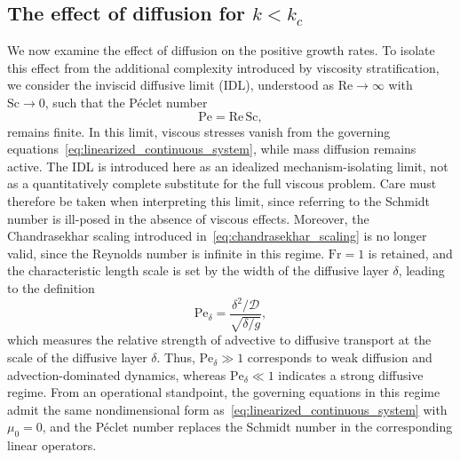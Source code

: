 \documentclass[11pt]{article}
\newcommand{\Sch}{\mathrm{Sc}}
\newcommand{\Frd}{\mathrm{Fr}}
\newcommand{\Pe}{\mathrm{Pe}}
\newcommand{\Rey}{\mathrm{Re}}
\begin{document}
\subsection{The effect of diffusion for \texorpdfstring{\(k < k_c\)}{k < kc}}
\label{subsec:budget_idl}
We now examine the effect of diffusion on the positive growth rates. To isolate this effect from the additional complexity introduced by viscosity stratification, we consider the inviscid diffusive limit (IDL), understood as \(\Rey \to \infty\) with \(\Sch \to 0\), such that the P\'{e}clet number
\begin{equation}
    \Pe = \Rey \, \Sch,
\end{equation}
remains finite. In this limit, viscous stresses vanish from the governing equations~\eqref{eq:linearized_continuous_system}, while mass diffusion remains active. The IDL is introduced here as an idealized mechanism-isolating limit, not as a quantitatively complete substitute for the full viscous problem. Care must therefore be taken when interpreting this limit, since referring to the Schmidt number is ill-posed in the absence of viscous effects. Moreover, the Chandrasekhar scaling introduced in~\eqref{eq:chandrasekhar_scaling} is no longer valid, since the Reynolds number is infinite in this regime. \(\Frd = 1\) is retained, and the characteristic length scale is set by the width of the diffusive layer \(\delta\), leading to the definition
\begin{equation}
    \mathrm{Pe}_\delta = \frac{\delta^{2}/\mathcal{D}}{\sqrt{\delta/g}},
\end{equation}
which measures the relative strength of advective to diffusive transport at the scale of the diffusive layer \(\delta\). Thus, \(\mathrm{Pe}_\delta \gg 1\) corresponds to weak diffusion and advection-dominated dynamics, whereas \(\mathrm{Pe}_\delta \ll 1\) indicates a strong diffusive regime. From an operational standpoint, the governing equations in this regime admit the same nondimensional form as~\eqref{eq:linearized_continuous_system} with \(\mu_0 = 0\), and the P\'{e}clet number replaces the Schmidt number in the corresponding linear operators.
\end{document}
